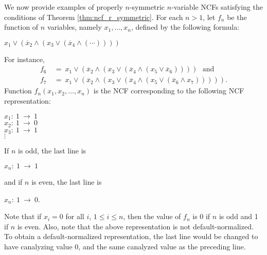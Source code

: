 \medskip

\noindent
We now provide
examples of properly $n$-symmetric $n$-variable NCFs satisfying the
conditions of Theorem \ref{thm:ncf_r_symmetric}.
For each $n > 1$, let $f_n$ be the function of $n$ variables, namely
$x_1, \ldots, x_n$, defined by the following formula:

\smallskip

\hspace*{0.5in} $x_1 \vee (\overline{x}_2 \wedge 
    ( x_3 \vee (\overline{x}_4 \wedge (\cdots ))))$

\smallskip

\noindent
For instance,
\begin{align*}
f_6 &~=~  x_1 \vee (\overline{x}_2 \wedge (x_3 \vee (\overline{x}_4 \wedge 
      (x_5 \vee \overline{x}_6))))~~~ \mathrm{and}\\
f_7 &~=~  x_1 \vee (\overline{x}_2 \wedge (x_3 \vee (\overline{x}_4 \wedge (x_5 
          \vee (\overline{x}_6 \wedge  x_7))))).
\end{align*}
Function $f_n(x_1, x_2, \ldots, x_n)$ is the NCF corresponding to
the following NCF representation:

\medskip

\noindent
\hspace*{0.25in}
$x_1:~ 1 ~\longrightarrow~ 1$ \\
\hspace*{0.25in}
$x_2:~ 1 ~\longrightarrow~ 0$ \\
\hspace*{0.25in}
$x_3:~ 1 ~\longrightarrow~ 1$ \\
\hspace*{0.75in}
$\vdots$ 

\smallskip

\noindent
If $n$ is odd, the last line is 

\smallskip

\noindent
\hspace*{0.25in}
$x_n:~ 1 ~\longrightarrow~ 1$ 

\smallskip

\noindent
and if $n$ is even, the last line is 

\smallskip

\noindent
\hspace*{0.25in}
$x_n:~ 1 ~\longrightarrow~ 0$. 

\smallskip

\noindent
Note that if $x_i = 0$ for all $i$, $1 \leq i \leq n$, then the
value of $f_n$ is 0 if $n$ is odd and 1 if $n$ is even.  Also, note
that the above representation is not default-normalized. 
To obtain a default-normalized 
representation, the last line would be changed to have canalyzing
value 0, and the same canalyzed value as the preceding line.

